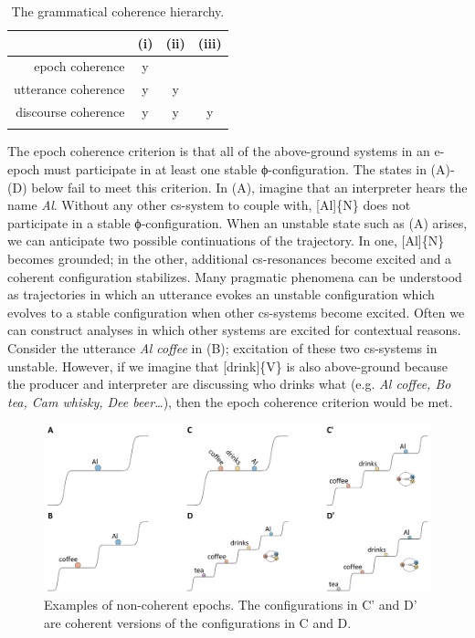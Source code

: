 \begin{table}
\begin{tabularx}{.66\textwidth}{rCCC}
\lsptoprule
& (i) & (ii) & (iii)\\
\midrule 
\raggedleft epoch coherence & y &  & \\
\raggedleft utterance coherence & y & y & \\
\raggedleft discourse coherence & y & y & y\\
\lspbottomrule
\end{tabularx}
\caption{The grammatical coherence hierarchy.}\label{tab:6:1}
\end{table}
  The epoch coherence criterion is that all of the above-ground systems in an e-epoch must participate in at least one stable ϕ-configuration. The states in {}(A)-(D) below fail to meet this criterion. In (A), imagine that an interpreter hears the name \textit{Al}. Without any other cs-system to couple with, [Al]\{N\} does not participate in a stable ϕ-configuration. When an unstable state such as (A) arises, we can anticipate two possible continuations of the trajectory. In one, [Al]\{N\} becomes grounded; in the other, additional cs-resonances become excited and a coherent configuration stabilizes. Many pragmatic phenomena can be understood as trajectories in which an utterance evokes an unstable configuration which evolves to a stable configuration when other cs-systems become excited. Often we can construct analyses in which other systems are excited for contextual reasons. Consider the utterance \textit{Al coffee} in (B); excitation of these two cs-systems in unstable. However, if we imagine that [drink]\{V\} is also above-ground because the producer and interpreter are discussing who drinks what (e.g. \textit{Al coffee, Bo tea, Cam whisky, Dee beer…}), then the epoch coherence criterion would be met.

  
\begin{figure}
\includegraphics[width=\textwidth]{figures/Tilsen-img124.png}
\caption{Examples of non-coherent epochs. The configurations in C' and D' are coherent versions of the configurations in C and D.}
\label{fig:6:5}
\end{figure}
 


